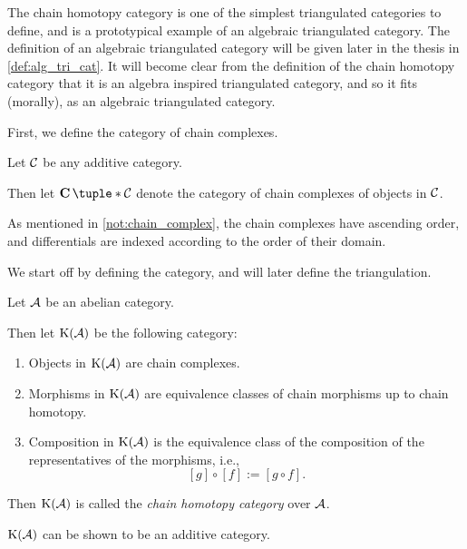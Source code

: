 The chain homotopy category is one of the simplest triangulated categories to define, and is a prototypical example of an algebraic triangulated category. The definition of an algebraic triangulated category will be given later in the thesis in \autoref{def:alg_tri_cat}. It will become clear from the definition of the chain homotopy category that it is an algebra inspired triangulated category, and so it fits (morally), as an algebraic triangulated category.

First, we define the category of chain complexes.

\begin{definition}
    \label{def:chain_complex}
    Let \( {\mathcal{C}} \) be any additive category.
    
    Then let \( \C \tuple*{\Cc} \) denote the category of chain complexes of objects in \( {\mathcal{C}} \).

    As mentioned in \autoref{not:chain_complex}, the chain complexes have ascending order, and differentials are indexed according to the order of their domain.
\end{definition}

We start off by defining the category, and will later define the triangulation.

\begin{definition}
    \label{def:chain_homotopy_cat}
    Let \( {\mathcal{A}} \) be an abelian category.

    Then let \( \operatorname{K}({\mathcal{A}}) \) be the following category:
    \begin{enumerate}
        \item {
            Objects in \( \operatorname{K}({\mathcal{A}}) \) are chain complexes.
        }
        \item {
            Morphisms in \( \operatorname{K}({\mathcal{A}}) \) are equivalence classes of chain morphisms up to chain homotopy.
        }
        \item {
            Composition in \( \operatorname{K}({\mathcal{A}}) \) is the equivalence class of the composition of the representatives of the morphisms, i.e.,
            \[
                [g] \circ [f] := [g \circ f ].
            \]
        }
    \end{enumerate}

    Then \( \operatorname{K}({\mathcal{A}}) \) is called the \emph{chain homotopy category} over \( {\mathcal{A}} \).
\end{definition}

\( \operatorname{K}({\mathcal{A}}) \) can be shown to be an additive category.

